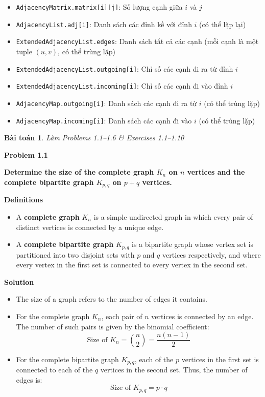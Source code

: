 \documentclass{article}
\newtheorem{baitoan}{Bài toán}
\begin{document}
\begin{itemize}
    \item \texttt{AdjacencyMatrix.matrix[i][j]}: Số lượng cạnh giữa $i$ và $j$
    \item \texttt{AdjacencyList.adj[i]}: Danh sách các đỉnh kề với đỉnh $i$ (có thể lặp lại)
    \item \texttt{ExtendedAdjacencyList.edges}: Danh sách tất cả các cạnh (mỗi cạnh là một tuple $(u,v)$, có thể trùng lặp)
    \item \texttt{ExtendedAdjacencyList.outgoing[i]}: Chỉ số các cạnh đi ra từ đỉnh $i$
    \item \texttt{ExtendedAdjacencyList.incoming[i]}: Chỉ số các cạnh đi vào đỉnh $i$
    \item \texttt{AdjacencyMap.outgoing[i]}: Danh sách các cạnh đi ra từ $i$ (có thể trùng lặp)
    \item \texttt{AdjacencyMap.incoming[i]}: Danh sách các cạnh đi vào $i$ (có thể trùng lặp)
\end{itemize}


\begin{baitoan}
    Làm Problems 1.1--1.6 \& Exercises 1.1--1.10
\end{baitoan}

\textbf{Problem 1.1}

\textbf{Determine the size of the complete graph $K_n$ on $n$ vertices and the complete bipartite graph $K_{p,q}$ on $p + q$ vertices.}

\textbf{Definitions}

\begin{itemize}
    \item A \textbf{complete graph} $K_n$ is a simple undirected graph in which every pair of distinct vertices is connected by a unique edge.
    \item A \textbf{complete bipartite graph} $K_{p,q}$ is a bipartite graph whose vertex set is partitioned into two disjoint sets with $p$ and $q$ vertices respectively, and where every vertex in the first set is connected to every vertex in the second set.
\end{itemize}

\textbf{Solution}

\begin{itemize}
    \item The size of a graph refers to the number of edges it contains.
    
    \item For the complete graph $K_n$, each pair of $n$ vertices is connected by an edge. The number of such pairs is given by the binomial coefficient:
    \[
    \text{Size of } K_n = \binom{n}{2} = \frac{n(n-1)}{2}
    \]

    \item For the complete bipartite graph $K_{p,q}$, each of the $p$ vertices in the first set is connected to each of the $q$ vertices in the second set. Thus, the number of edges is:
    \[
    \text{Size of } K_{p,q} = p \cdot q
    \]
\end{itemize}
\end{document}
